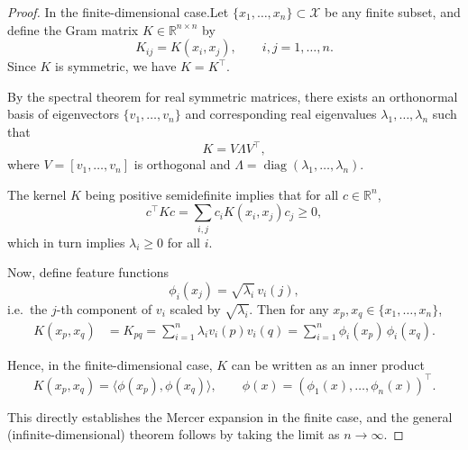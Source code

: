 \documentclass[../main]{subfiles}
\begin{document}
    \begin{proof}
        In the finite-dimensional case.Let $\{x_1, \dots, x_n\} \subset \mathcal{X}$ be any finite subset, and 
        define the Gram matrix $K \in \mathbb{R}^{n \times n}$ by
        \begin{equation}
            K_{ij} = K(x_i, x_j), \qquad i,j = 1,\dots,n.
        \end{equation}
        Since $K$ is symmetric, we have $K = K^\top$.
        
        By the spectral theorem for real symmetric matrices, 
        there exists an orthonormal basis of eigenvectors 
        $\{v_1, \dots, v_n\}$ and corresponding real eigenvalues 
        $\lambda_1, \dots, \lambda_n$ such that
        \begin{equation}
            K = V \Lambda V^\top,
        \end{equation}
        where $V = [v_1,\dots,v_n]$ is orthogonal and 
        $\Lambda = \operatorname{diag}(\lambda_1,\dots,\lambda_n)$.
        
        The kernel $K$ being positive semidefinite implies that
        for all $c \in \mathbb{R}^n$,
        \begin{equation}
            c^\top K c 
        = \sum_{i,j} c_i K(x_i, x_j) c_j \ge 0,
        \end{equation}
        which in turn implies $\lambda_i \ge 0$ for all $i$.
        
        Now, define feature functions 
        \begin{equation}
            \phi_i(x_j) = \sqrt{\lambda_i}\, v_i(j),
        \end{equation}
        i.e.\ the $j$-th component of $v_i$ scaled by $\sqrt{\lambda_i}$.
        Then for any $x_p, x_q \in \{x_1, \dots, x_n\}$,
        \begin{align}
        K(x_p, x_q)
        &= K_{pq}
         = \sum_{i=1}^n \lambda_i v_i(p) v_i(q)
         = \sum_{i=1}^n \phi_i(x_p)\, \phi_i(x_q).
        \end{align}
        
        Hence, in the finite-dimensional case,
        $K$ can be written as an inner product
        \begin{equation}
            K(x_p, x_q) = \langle \phi(x_p), \phi(x_q) \rangle,
        \qquad 
        \phi(x) = (\phi_1(x), \dots, \phi_n(x))^\top.
        \end{equation}

        This directly establishes the Mercer expansion in the finite case,
        and the general (infinite-dimensional) theorem follows by 
        taking the limit as $n \to \infty$.
        \end{proof}
\end{document}
